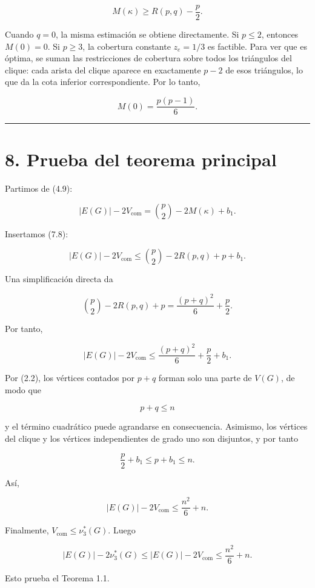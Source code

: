 \documentclass[
  11pt,
]{article}
\begin{document}
\[
\boxed{
M(\kappa)
\ge
R(p,q)-\frac p2.
}
\tag{7.8}
\]

Cuando \(q=0\), la misma estimación se obtiene directamente. Si
\(p\le2\), entonces \(M(0)=0\). Si \(p\ge3\), la cobertura constante
\(z_e=1/3\) es factible. Para ver que es óptima, se suman las
restricciones de cobertura sobre todos los triángulos del clique: cada
arista del clique aparece en exactamente \(p-2\) de esos triángulos, lo
que da la cota inferior correspondiente. Por lo tanto,

\[
M(0)=\frac{p(p-1)}6.
\]

\begin{center}\rule{0.5\linewidth}{0.5pt}\end{center}

\section{8. Prueba del teorema
principal}\label{prueba-del-teorema-principal}

Partimos de (4.9):

\[
|E(G)|-2V_{\mathrm{com}}
=
\binom p2-2M(\kappa)+b_1.
\]

Insertamos (7.8):

\[
|E(G)|-2V_{\mathrm{com}}
\le
\binom p2-2R(p,q)+p+b_1.
\tag{8.1}
\]

Una simplificación directa da

\[
\binom p2-2R(p,q)+p
=
\frac{(p+q)^2}{6}+\frac p2.
\tag{8.2}
\]

Por tanto,

\[
|E(G)|-2V_{\mathrm{com}}
\le
\frac{(p+q)^2}{6}+\frac p2+b_1.
\tag{8.3}
\]

Por (2.2), los vértices contados por \(p+q\) forman solo una parte de
\(V(G)\), de modo que

\[
p+q\le n
\]

y el término cuadrático puede agrandarse en consecuencia. Asimismo, los
vértices del clique y los vértices independientes de grado uno son
disjuntos, y por tanto

\[
\frac p2+b_1
\le
p+b_1
\le
n.
\]

Así,

\[
|E(G)|-2V_{\mathrm{com}}
\le
\frac{n^2}{6}+n.
\tag{8.4}
\]

Finalmente, \(V_{\mathrm{com}}\le\nu_3^*(G)\). Luego

\[
|E(G)|-2\nu_3^*(G)
\le
|E(G)|-2V_{\mathrm{com}}
\le
\frac{n^2}{6}+n.
\]

Esto prueba el Teorema 1.1.
\end{document}
